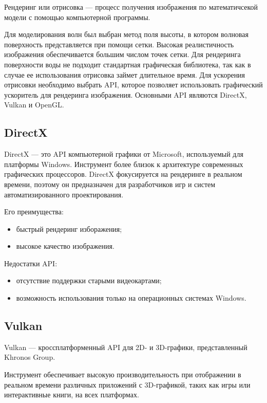 Рендеринг или отрисовка --- процесс получения изображения по математичсекой модели с помощью компьютерной программы.

Для моделирования волн был выбран метод поля высоты, в котором волновая поверхность представляется при помощи сетки. Высокая реалистичность изображения обеспечивается большим числом точек сетки. Для рендеринга поверхности воды не подходит стандартная графическая библиотека, так как в случае ее использования отрисовка займет длительное время. Для ускорения отрисовки необходимо выбрать API, которое позволяет использовать графический ускоритель для рендеринга изображения. Основными API являются DirectX, Vulkan и OpenGL.

\subsection{DirectX}

DirectX --- это API компьютерной графики от Microsoft, используемый для платформы Windows. Инструмент более близок к архитектуре современных графических процессоров. DirectX фокусируется на рендеринге в реальном времени, поэтому он предназначен для разработчиков игр и систем автоматизированного проектирования.

Его преимущества:

\begin{itemize}
	\item быстрый рендеринг изборажения;
	\item высокое качество изображения.
\end{itemize}

Недостатки API:

\begin{itemize}
	\item отсутствие поддержки старыми видеокартами;
	\item возможность использования только на операционных системах Windows.
\end{itemize}

\subsection{Vulkan}

Vulkan --- кроссплатформенный API для 2D- и 3D-графики, представленный Khronos Group.

Инструмент обеспечивает высокую производительность при отображении в реальном времени различных приложений с 3D-графикой, таких как игры или интерактивные книги, на всех платформах.

